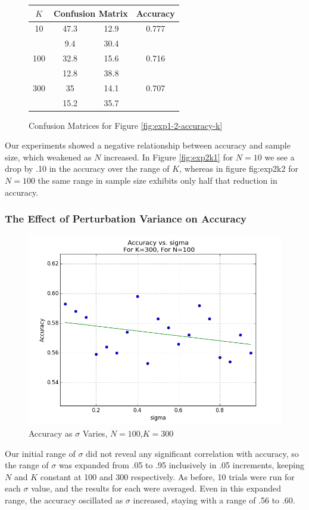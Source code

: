 \documentclass{article}
\begin{document}
\begin{figure}[H]
\centering
\begin{tabular}{|c|c|c|c|}
\hline
$K$&\multicolumn{2}{|c|}{Confusion Matrix}&Accuracy\\
\hline
10&47.3&12.9&0.777\\
\cline{2-3}
&9.4&30.4&\\
\hline
100&32.8&15.6&0.716\\
\cline{2-3}
&12.8&38.8&\\
\hline
300&35&14.1&0.707\\
\cline{2-3}
&15.2&35.7&\\
\hline
\end{tabular}
\caption{Confusion Matrices for Figure \ref{fig:exp1-2-accuracy-k}}\label{fig:cm-exp1-2-accuracy-k}
\end{figure}
Our experiments showed a negative relationship between accuracy and sample size, which weakened as $N$ increased. In Figure \ref{fig:exp2k1} for $N=10$ we see a drop by .10 in the accuracy over the range of $K$, whereas in figure {fig:exp2k2} for $N=100$ the same range in sample size exhibits only half that reduction in accuracy.
\subsubsection{The Effect of Perturbation Variance on Accuracy}
\begin{figure}[H]
    \centering
        \includegraphics[width=\textwidth]{experiment1-2-sigmas.png}
    \caption{Accuracy as $\sigma$ Varies, $N=100$,$K=300$}\label{fig:exp1-2-accuracy-s}
\end{figure}
Our initial range of $\sigma$  did not reveal any significant correlation with accuracy, so the range of $\sigma$ was expanded from .05  to .95 inclusively in .05 increments, keeping $N$ and $K$ constant at 100 and 300 respectively. As before, 10 trials were run for each $\sigma$ value, and the results for each were averaged. Even in this expanded range, the accuracy oscillated as $\sigma$ increased, staying with a range of .56 to .60.
\end{document}
